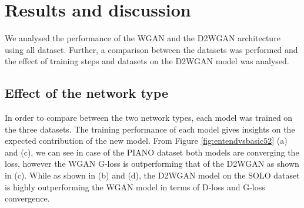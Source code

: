 \documentclass{article} %
\begin{document}
\section{Results and discussion}
We analysed the performance of the WGAN and the D2WGAN architecture using all dataset. Further, a comparison between the datasets was performed and the effect of training steps and datasets on the D2WGAN model was analysed.

\subsection{Effect of the network type}
In order to compare between the two network types, each model was trained on the three datasets. The training performance of each model gives insights on the expected contribution of the new model. From Figure \ref{fig:entendvsbasic52} (a) and (c), we can see in case of the PIANO dataset both models are converging the loss, however the WGAN G-loss is outperforming that of the D2WGAN as shown in (c). While as shown in (b) and (d), the D2WGAN model on the SOLO dataset is highly outperforming the WGAN model in terms of D-loss and G-loss convergence.
\end{document}
